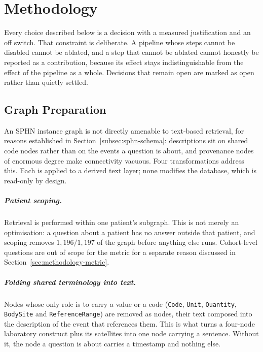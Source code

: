 \chapter{Methodology} \label{chapter:methodology}

Every choice described below is a decision with a measured justification and an
off switch. That constraint is deliberate. A pipeline whose steps cannot be
disabled cannot be ablated, and a step that cannot be ablated cannot honestly be
reported as a contribution, because its effect stays indistinguishable from the
effect of the pipeline as a whole. Decisions that remain open are marked as open
rather than quietly settled.

\section{Graph Preparation} \label{sec:methodology-preparation}

An SPHN instance graph is not directly amenable to text-based retrieval, for
reasons established in Section~\ref{subsec:sphn-schema}: descriptions sit on
shared code nodes rather than on the events a question is about, and provenance
nodes of enormous degree make connectivity vacuous. Four transformations address
this. Each is applied to a derived text layer; none modifies the database, which
is read-only by design.

\paragraph{Patient scoping.} Retrieval is performed within one patient's
subgraph. This is not merely an optimisation: a question about a patient has no
answer outside that patient, and scoping removes $1{,}196/1{,}197$ of the graph
before anything else runs. Cohort-level questions are out of scope for the metric
for a separate reason discussed in Section~\ref{sec:methodology-metric}.

\paragraph{Folding shared terminology into text.} Nodes whose only role is to
carry a value or a code (\texttt{Code}, \texttt{Unit}, \texttt{Quantity},
\texttt{BodySite} and \texttt{ReferenceRange}) are removed as nodes, their text
composed into the description of the event that references them. This is what
turns a four-node laboratory construct plus its satellites into one node carrying
a sentence. Without it, the node a question is about carries a timestamp and
nothing else.

